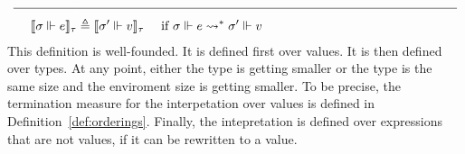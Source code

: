 \begin{definition}
\begin{equation}
\begin{aligned}[c]
  \rule{5em}{0.4pt}&\rule{30em}{0.4pt}\\
  \llbracket \sigma \Vdash e \rrbracket_{\tau} &\triangleq \llbracket \sigma'
    \Vdash v\rrbracket_{\tau} \quad{\text{ if } \sigma \Vdash e
    \rightsquigarrow^* \sigma' \Vdash v}
  \end{aligned}
  \end{equation}
  This definition is well-founded. It is defined first over values. It is then
  defined over types. At any point, either the type is getting smaller or the
  type is the same size and the enviroment size is getting smaller. To be
  precise, the termination measure for the interpetation over values is defined
  in Definition~\ref{def:orderings}. Finally, the intepretation is defined over
  expressions that are not values, if it can be rewritten to a value.
\end{definition}

